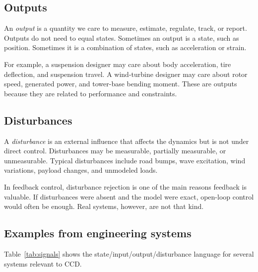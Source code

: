 \documentclass[11pt]{article}
\begin{document}
\subsection{Outputs}

An \emph{output} is a quantity we care to measure, estimate, regulate, track, or report. Outputs do not need to equal states. Sometimes an output is a state, such as position. Sometimes it is a combination of states, such as acceleration or strain.

For example, a suspension designer may care about body acceleration, tire deflection, and suspension travel. A wind-turbine designer may care about rotor speed, generated power, and tower-base bending moment. These are outputs because they are related to performance and constraints.

\subsection{Disturbances}

A \emph{disturbance} is an external influence that affects the dynamics but is not under direct control. Disturbances may be measurable, partially measurable, or unmeasurable. Typical disturbances include road bumps, wave excitation, wind variations, payload changes, and unmodeled loads.

In feedback control, disturbance rejection is one of the main reasons feedback is valuable. If disturbances were absent and the model were exact, open-loop control would often be enough. Real systems, however, are not that kind.

\subsection{Examples from engineering systems}

Table~\ref{tab:signals} shows the state/input/output/disturbance language for several systems relevant to CCD.
\end{document}

